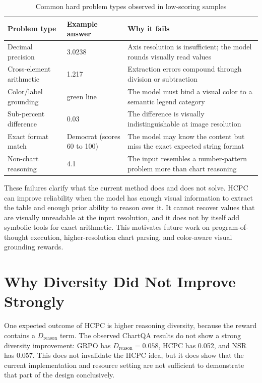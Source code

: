 \documentclass{iutbscthesis}
\begin{document}
\begin{table}[H]
    \centering
    \begin{tabular}{p{3.4cm}p{3cm}p{5.3cm}}
        \toprule
        Problem type & Example answer & Why it fails \\
        \midrule
        Decimal precision & 3.0238 & Axis resolution is insufficient; the model rounds visually read values \\
        Cross-element arithmetic & 1.217 & Extraction errors compound through division or subtraction \\
        Color/label grounding & green line & The model must bind a visual color to a semantic legend category \\
        Sub-percent difference & 0.03 & The difference is visually indistinguishable at image resolution \\
        Exact format match & Democrat (scores 60 to 100) & The model may know the content but miss the exact expected string format \\
        Non-chart reasoning & 4.1 & The input resembles a number-pattern problem more than chart reasoning \\
        \bottomrule
    \end{tabular}
    \caption{Common hard problem types observed in low-scoring samples}
    \label{tab:hard_problem_types}
\end{table}

These failures clarify what the current method does and does not solve. HCPC can improve reliability when the model has enough visual information to extract the table and enough prior ability to reason over it. It cannot recover values that are visually unreadable at the input resolution, and it does not by itself add symbolic tools for exact arithmetic. This motivates future work on program-of-thought execution, higher-resolution chart parsing, and color-aware visual grounding rewards.

\section{Why Diversity Did Not Improve Strongly}

One expected outcome of HCPC is higher reasoning diversity, because the reward contains a $D_{\text{reason}}$ term. The observed ChartQA results do not show a strong diversity improvement: GRPO has $D_{\text{reason}}=0.058$, HCPC has 0.052, and NSR has 0.057. This does not invalidate the HCPC idea, but it does show that the current implementation and resource setting are not sufficient to demonstrate that part of the design conclusively.
\end{document}
